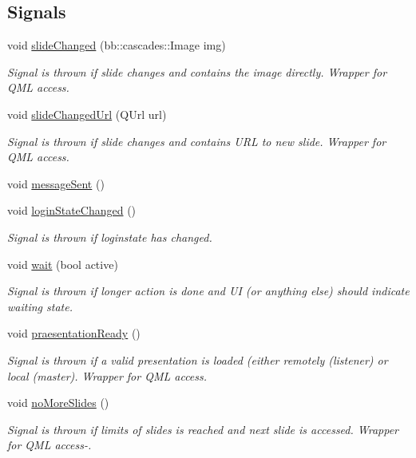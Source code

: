 \subsection*{Signals}
\begin{DoxyCompactItemize}
\item 
void \hyperlink{class_client_a1e3abd2fbe9f7a90afba3fc8071e1c30}{slide\+Changed} (bb\+::cascades\+::\+Image img)
\begin{DoxyCompactList}\small\item\em Signal is thrown if slide changes and contains the image directly. Wrapper for Q\+M\+L access. \end{DoxyCompactList}\item 
void \hyperlink{class_client_a2497dd354669579559ea47ce06859778}{slide\+Changed\+Url} (Q\+Url url)
\begin{DoxyCompactList}\small\item\em Signal is thrown if slide changes and contains U\+R\+L to new slide. Wrapper for Q\+M\+L access. \end{DoxyCompactList}\item 
void \hyperlink{class_client_accd6ad8ab25220bb0dbca8fae6330649}{message\+Sent} ()
\item 
void \hyperlink{class_client_aece1384151539c912f74e693642c3be4}{login\+State\+Changed} ()
\begin{DoxyCompactList}\small\item\em Signal is thrown if loginstate has changed. \end{DoxyCompactList}\item 
void \hyperlink{class_client_ae5883ec5efa56fc8f3524e21f24b1d44}{wait} (bool active)
\begin{DoxyCompactList}\small\item\em Signal is thrown if longer action is done and U\+I (or anything else) should indicate waiting state. \end{DoxyCompactList}\item 
void \hyperlink{class_client_a3da034ec31aa0ff81af386a3b0222209}{praesentation\+Ready} ()
\begin{DoxyCompactList}\small\item\em Signal is thrown if a valid presentation is loaded (either remotely (listener) or local (master). Wrapper for Q\+M\+L access. \end{DoxyCompactList}\item 
void \hyperlink{class_client_aeaa45726608dfeb0f5ec4c3fd2a987e5}{no\+More\+Slides} ()
\begin{DoxyCompactList}\small\item\em Signal is thrown if limits of slides is reached and next slide is accessed. Wrapper for Q\+M\+L access-\/. \end{DoxyCompactList}\end{DoxyCompactItemize}
